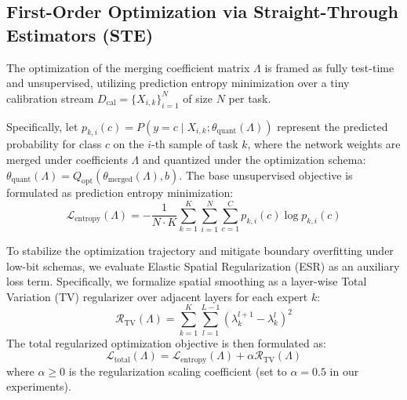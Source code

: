 \subsection{First-Order Optimization via Straight-Through Estimators (STE)}
The optimization of the merging coefficient matrix $\Lambda$ is framed as fully test-time and unsupervised, utilizing prediction entropy minimization \cite{wang2020tent, qmerge2025} over a tiny calibration stream $D_{\text{cal}} = \{X_{i, k}\}_{i=1}^N$ of size $N$ per task. 

Specifically, let $p_{k, i}(c) = P(y=c \mid X_{i, k}; \theta_{\text{quant}}(\Lambda))$ represent the predicted probability for class $c$ on the $i$-th sample of task $k$, where the network weights are merged under coefficients $\Lambda$ and quantized under the optimization schema: $\theta_{\text{quant}}(\Lambda) = Q_{\text{opt}}(\theta_{\text{merged}}(\Lambda), b)$. The base unsupervised objective is formulated as prediction entropy minimization:
\begin{equation}
    \mathcal{L}_{\text{entropy}}(\Lambda) = -\frac{1}{N \cdot K} \sum_{k=1}^K \sum_{i=1}^N \sum_{c=1}^C p_{k, i}(c) \log p_{k, i}(c)
\end{equation}

To stabilize the optimization trajectory and mitigate boundary overfitting under low-bit schemas, we evaluate Elastic Spatial Regularization (ESR) as an auxiliary loss term. Specifically, we formalize spatial smoothing as a layer-wise Total Variation (TV) regularizer over adjacent layers for each expert $k$:
\begin{equation}
    \mathcal{R}_{\text{TV}}(\Lambda) = \sum_{k=1}^K \sum_{l=1}^{L-1} (\lambda_k^{l+1} - \lambda_k^l)^2
\end{equation}
The total regularized optimization objective is then formulated as:
\begin{equation}
    \mathcal{L}_{\text{total}}(\Lambda) = \mathcal{L}_{\text{entropy}}(\Lambda) + \alpha \mathcal{R}_{\text{TV}}(\Lambda)
\end{equation}
where $\alpha \ge 0$ is the regularization scaling coefficient (set to $\alpha = 0.5$ in our experiments).

